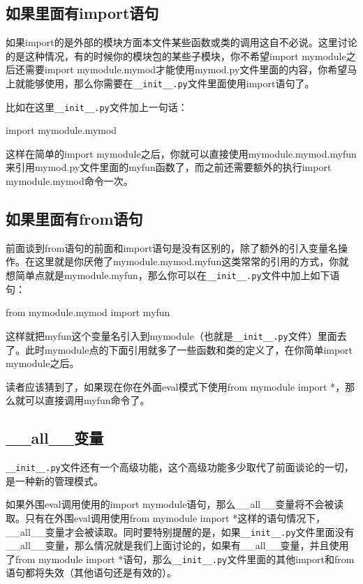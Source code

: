 \documentclass[12pt,oneside]{book}
\begin{document}
\begin{common-format}
\subsection{如果里面有import语句}
如果import的是外部的模块方面本文件某些函数或类的调用这自不必说。这里讨论的是这种情况，有的时候你的模块包的某些子模块，你不希望import mymodule之后还需要import mymodule.mymod才能使用mymod.py文件里面的内容，你希望马上就能够使用，那么你需要在\verb+__init__.py+文件里面使用import语句了。

比如在这里\verb+__init__.py+文件加上一句话：
\begin{tcbpython}
import mymodule.mymod
\end{tcbpython}

这样在简单的import mymodule之后，你就可以直接使用mymodule.mymod.myfun来引用mymod.py文件里面的myfun函数了，而之前还需要额外的执行import mymodule.mymod命令一次。


\subsection{如果里面有from语句}
前面谈到from语句的前面和import语句是没有区别的，除了额外的引入变量名操作。在这里就是你厌倦了mymodule.mymod.myfun这类常常的引用的方式，你就想简单点就是mymodule.myfun，那么你可以在\verb+__init__.py+文件中加上如下语句：
\begin{tcbpython}[]
from mymodule.mymod import myfun
\end{tcbpython}
这样就把myfun这个变量名引入到mymodule（也就是\verb+__init__.py+文件）里面去了。此时mymodule点的下面引用就多了一些函数和类的定义了，在你简单import mymodule之后。

读者应该猜到了，如果现在你在外面eval模式下使用from mymodule import *，那么就可以直接调用myfun命令了。


\subsection{\_{}\_{}all\_{}\_{}变量}
\verb+__init__.py+文件还有一个高级功能，这个高级功能多少取代了前面谈论的一切，是一种新的管理模式。

如果外围eval调用使用的import mymodule语句，那么\_{}\_{}all\_{}\_{}变量将不会被读取。只有在外围eval调用使用from mymodule import *这样的语句情况下，\_{}\_{}all\_{}\_{}变量才会被读取。同时要特别提醒的是，如果\verb+__init__.py+文件里面没有\_{}\_{}all\_{}\_{}变量，那么情况就是我们上面讨论的，如果有\_{}\_{}all\_{}\_{}变量，并且使用了from mymodule import *语句，那么\verb+__init__.py+文件里面的其他import和from语句都将失效（其他语句还是有效的）。


\end{common-format}
\end{document}
